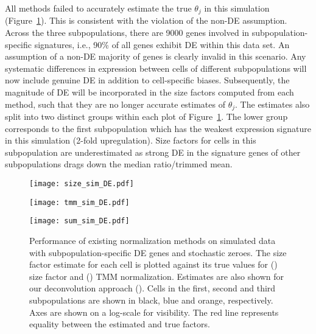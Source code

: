\documentclass{article}
\begin{document}

All methods failed to accurately estimate the true $\theta_j$ in this simulation (Figure~\ref{fig:sim_DE}).
This is consistent with the violation of the non-DE assumption.
Across the three subpopulations, there are 9000 genes involved in subpopulation-specific signatures, i.e., 90\% of all genes exhibit DE within this data set.
An assumption of a non-DE majority of genes is clearly invalid in this scenario.
Any systematic differences in expression between cells of different subpopulations will now include genuine DE in addition to cell-specific biases.
Subsequently, the magnitude of DE will be incorporated in the size factors computed from each method, such that they are no longer accurate estimates of $\theta_j$.
The estimates also split into two distinct groups within each plot of Figure~\ref{fig:sim_DE}.
The lower group corresponds to the first subpopulation which has the weakest expression signature in this simulation (2-fold upregulation).
Size factors for cells in this subpopulation are underestimated as strong DE in the signature genes of other subpopulations drags down the median ratio/trimmed mean.

\begin{figure}[tb]
\begin{minipage}{0.33\textwidth}
\texttt{[image: size\_sim\_DE.pdf]}
\subcaption{}\label{subfig:size_DE}
\end{minipage}
\begin{minipage}{0.33\textwidth}
\texttt{[image: tmm\_sim\_DE.pdf]}
\subcaption{}\label{subfig:tmm_DE}
\end{minipage}
\begin{minipage}{0.33\textwidth}
\texttt{[image: sum\_sim\_DE.pdf]}
\subcaption{}\label{subfig:sum_DE}
\end{minipage}
\caption{
    Performance of existing normalization methods on simulated data with subpopulation-specific DE genes and stochastic zeroes.
    The size factor estimate for each cell is plotted against its true values for () size factor and () TMM normalization.
    Estimates are also shown for our deconvolution approach ().
    Cells in the first, second and third subpopulations are shown in black, blue and orange, respectively.
    Axes are shown on a log-scale for visibility.
    The red line represents equality between the estimated and true factors.
}
\label{fig:sim_DE}
\end{figure}
\end{document}
